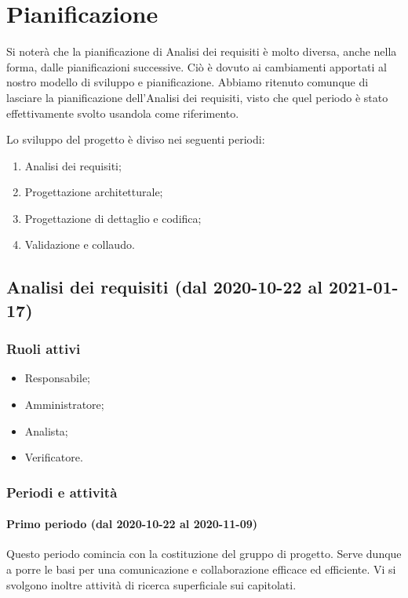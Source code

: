 \section{Pianificazione}
Si noterà che la pianificazione di Analisi dei requisiti è molto diversa, anche nella forma, dalle pianificazioni successive. Ciò è dovuto ai cambiamenti apportati al nostro modello di sviluppo e pianificazione. Abbiamo ritenuto comunque di lasciare la pianificazione dell'Analisi dei requisiti, visto che quel periodo è stato effettivamente svolto usandola come riferimento.


Lo sviluppo del progetto è diviso nei seguenti periodi:
\begin{enumerate}
	\item Analisi dei requisiti;
	\item Progettazione architetturale;
	\item Progettazione di dettaglio e codifica;
	\item Validazione e collaudo.
\end{enumerate} 

\subsection{Analisi dei requisiti (dal 2020-10-22 al 2021-01-17)}

\subsubsection{Ruoli attivi}
\begin{itemize}
	\item Responsabile;
	\item Amministratore;
	\item Analista;
	\item Verificatore.
\end{itemize}

\subsubsection{Periodi e attività}

\paragraph{Primo periodo (dal 2020-10-22 al 2020-11-09)}
Questo periodo comincia con la costituzione del gruppo di progetto. Serve dunque a porre le basi per una comunicazione e collaborazione efficace ed efficiente. Vi si svolgono inoltre attività di ricerca superficiale sui capitolati.

